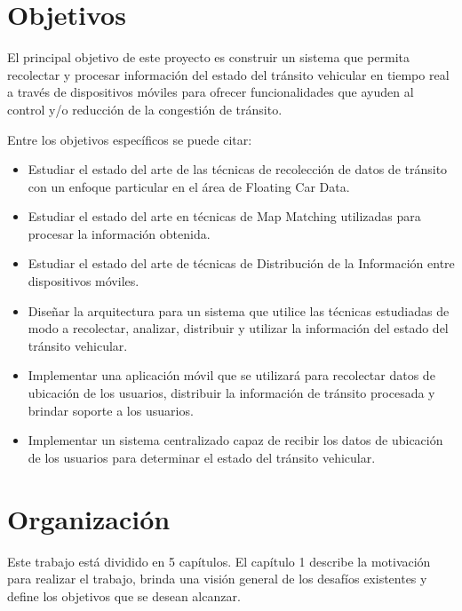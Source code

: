\documentclass[final,fmstyle]{fpunathesis}
\begin{document}
\section{Objetivos}
\label{sec:objetivos}

El principal objetivo de este proyecto es construir un sistema que permita recolectar y procesar información del estado del tránsito vehicular en tiempo real a través de dispositivos móviles para ofrecer funcionalidades que ayuden al control y/o reducción de la congestión de tránsito.

Entre los objetivos específicos se puede citar:

\begin{itemize}
\item Estudiar el estado del arte de las técnicas de recolección de datos de tránsito con un enfoque particular en el área de Floating Car Data.

\item Estudiar el estado del arte en técnicas de Map Matching utilizadas para procesar la información obtenida.

\item Estudiar el estado del arte de técnicas de Distribución de la Información entre dispositivos móviles.

\item Diseñar la arquitectura para un sistema que utilice las técnicas estudiadas de modo a recolectar, analizar, distribuir y utilizar la información del estado del tránsito vehicular.

\item Implementar una aplicación móvil que se utilizará para recolectar datos de ubicación de los usuarios, distribuir la información de tránsito procesada y brindar soporte a los usuarios.

\item Implementar un sistema centralizado capaz de recibir los datos de ubicación de los usuarios para determinar el estado del tránsito vehicular.
\end{itemize}

\section{Organización}

Este trabajo está dividido en 5 capítulos. El capítulo 1 describe la motivación para realizar el trabajo, brinda una visión general de los desafíos existentes y define los objetivos que se desean alcanzar.
\end{document}

